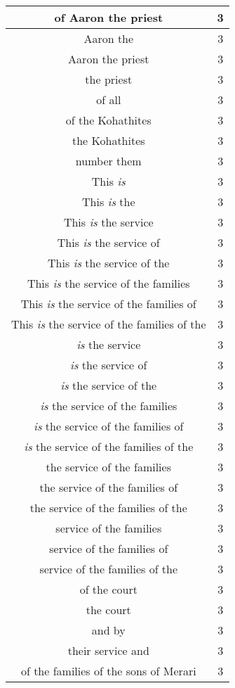\begin{center}
\begin{longtable}{|c|c|}
of Aaron the priest & 3\\ \hline 
Aaron the & 3\\ \hline 
Aaron the priest & 3\\ \hline 
the priest & 3\\ \hline 
of all & 3\\ \hline 
of the Kohathites & 3\\ \hline 
the Kohathites & 3\\ \hline 
number them & 3\\ \hline 
This \emph{is} & 3\\ \hline 
This \emph{is} the & 3\\ \hline 
This \emph{is} the service & 3\\ \hline 
This \emph{is} the service of & 3\\ \hline 
This \emph{is} the service of the & 3\\ \hline 
This \emph{is} the service of the families & 3\\ \hline 
This \emph{is} the service of the families of & 3\\ \hline 
This \emph{is} the service of the families of the & 3\\ \hline 
\emph{is} the service & 3\\ \hline 
\emph{is} the service of & 3\\ \hline 
\emph{is} the service of the & 3\\ \hline 
\emph{is} the service of the families & 3\\ \hline 
\emph{is} the service of the families of & 3\\ \hline 
\emph{is} the service of the families of the & 3\\ \hline 
the service of the families & 3\\ \hline 
the service of the families of & 3\\ \hline 
the service of the families of the & 3\\ \hline 
service of the families & 3\\ \hline 
service of the families of & 3\\ \hline 
service of the families of the & 3\\ \hline 
of the court & 3\\ \hline 
the court & 3\\ \hline 
and by & 3\\ \hline 
their service and & 3\\ \hline 
of the families of the sons of Merari & 3\\ \hline 

\end{longtable}
\end{center}
